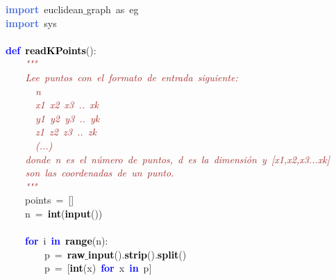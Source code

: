 \noindent
\mbox{}\textbf{\textcolor{RoyalBlue}{import}}\ euclidean$\_$graph\ as\ eg \\
\mbox{}\textbf{\textcolor{RoyalBlue}{import}}\ sys \\
\mbox{} \\
\mbox{}\textbf{\textcolor{Blue}{def}}\ \textbf{\textcolor{Black}{readKPoints}}\textcolor{BrickRed}{():} \\
\mbox{}\textit{\textcolor{Brown}{\ \ \ \ "{}"{}"{}}} \\
\mbox{}\textit{\textcolor{Brown}{\ \ \ \ Lee\ puntos\ con\ el\ formato\ de\ entrada\ siguiente:}} \\
\mbox{}\textit{\textcolor{Brown}{\ \ \ \ \ \ n}} \\
\mbox{}\textit{\textcolor{Brown}{\ \ \ \ \ \ x1\ x2\ x3\ ..\ xk}} \\
\mbox{}\textit{\textcolor{Brown}{\ \ \ \ \ \ y1\ y2\ y3\ ..\ yk}} \\
\mbox{}\textit{\textcolor{Brown}{\ \ \ \ \ \ z1\ z2\ z3\ ..\ zk}} \\
\mbox{}\textit{\textcolor{Brown}{\ \ \ \ \ \ (...)}} \\
\mbox{}\textit{\textcolor{Brown}{\ \ \ \ donde\ n\ es\ el\ número\ de\ puntos,\ d\ es\ la\ dimensión\ y\ [x1,x2,x3...xk]\ }} \\
\mbox{}\textit{\textcolor{Brown}{\ \ \ \ son\ las\ coordenadas\ de\ un\ punto.}} \\
\mbox{}\textit{\textcolor{Brown}{\ \ \ \ "{}"{}"{}}} \\
\mbox{}\ \ \ \ points\ \textcolor{BrickRed}{=}\ \textcolor{BrickRed}{[]} \\
\mbox{}\ \ \ \ n\ \textcolor{BrickRed}{=}\ \textbf{\textcolor{Black}{int}}\textcolor{BrickRed}{(}\textbf{\textcolor{Black}{input}}\textcolor{BrickRed}{())} \\
\mbox{} \\
\mbox{}\ \ \ \ \textbf{\textcolor{Blue}{for}}\ i\ \textbf{\textcolor{Blue}{in}}\ \textbf{\textcolor{Black}{range}}\textcolor{BrickRed}{(}n\textcolor{BrickRed}{):} \\
\mbox{}\ \ \ \ \ \ \ \ p\ \textcolor{BrickRed}{=}\ \textbf{\textcolor{Black}{raw$\_$input}}\textcolor{BrickRed}{().}\textbf{\textcolor{Black}{strip}}\textcolor{BrickRed}{().}\textbf{\textcolor{Black}{split}}\textcolor{BrickRed}{()} \\
\mbox{}\ \ \ \ \ \ \ \ p\ \textcolor{BrickRed}{=}\ \textcolor{BrickRed}{[}\textbf{\textcolor{Black}{int}}\textcolor{BrickRed}{(}x\textcolor{BrickRed}{)}\ \textbf{\textcolor{Blue}{for}}\ x\ \textbf{\textcolor{Blue}{in}}\ p\textcolor{BrickRed}{]} \\
